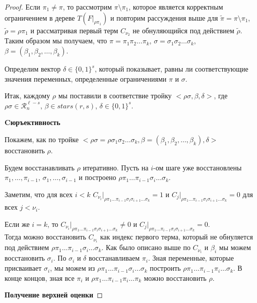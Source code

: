 \documentclass[12pt]{article}
\theoremstyle{plain}
\theoremstyle{remark}
\theoremstyle{definition}
\begin{document}
\begin{proof}
Если $\pi_1 \ne \pi$, то рассмотрим $\pi \setminus \pi_1$, которое является корректным ограничением в дереве $T(F|_{\rho\pi_1})$ и повторим рассуждения выше для $\widetilde{\pi} = \pi \setminus \pi_1$, $\widetilde{\rho} = \rho\pi_1$ и рассматривая первый терм  $C_{\nu_2}$ не обнуляющийся под действием $\widetilde{\rho}$. Таким образом мы получаем, что $\pi = \pi_1\pi_2\ldots \pi_k$, $\sigma = \sigma_1\sigma_2\ldots \sigma_k$, $\beta = \left( \beta_1, \beta_2, \ldots, \beta_k \right)$. 

Определим вектор $\delta \in \{0, 1\}^s$, который показывает, равны ли соответствующие значения переменных, определенные ограничениями $\pi$ и $\sigma$.

Итак, каждому $\rho$ мы поставили в соответствие тройку $<\rho\sigma, \beta, \delta>$, где $\rho\sigma \in \mathcal{R}_n^{\ell - s}$, $\beta \in stars(r, s)$, $\delta \in \{0, 1\}^s$.

\textbf{Cюръективность} 

Покажем, как по тройке $<\rho\sigma = \rho\sigma_1\sigma_2\ldots \sigma_k, \beta = \left( \beta_1, \beta_2, \ldots, \beta_k \right), \delta>$ восстановить $\rho$.

Будем восстанавливать $\rho$ итеративно.
Пусть на $i$-ом шаге уже восстановлены $\pi_1, \ldots, \pi_{i -1}$, $\sigma_1, \ldots, \sigma_{i - 1}$ и построено $\rho\pi_1\ldots\pi_{i -1}\sigma_i\ldots\sigma_k$. 

Заметим, что для всех $i < k$ $C_{\nu_i}|_{\rho\pi_1\ldots\pi_{i-1}\sigma_i\sigma_{i+1}\ldots\sigma_k} = 1$ и $C_j|_{\rho\pi_1\ldots\pi_{i-1}\sigma_i\sigma_{i+1}\ldots\sigma_k} = 0$ для всех $j < \nu_i$.  

Если же $i = k$, то $C_{\nu_i}|_{\rho\pi_1\ldots\pi_{i-1}\sigma_i\sigma_{i+1}\ldots\sigma_k} \ne 0$ и $C_j|_{\rho\pi_1\ldots\pi_{i-1}\sigma_i\sigma_{i+1}\ldots\sigma_k} = 0$. \\ Тогда можно восстановить $C_{\nu_i}$ как индекс первого терма, который не обнуляется под действием $\rho\pi_1\ldots\pi_{i -1}\sigma_i\ldots\sigma_k$.
Как было описано выше по $C_{\nu_i}$ и $\beta_i$ мы можем восстановить $\sigma_i$. По $\sigma_i$ и $\delta$ восстанавливаем $\pi_i$. Зная переменные, которые присваивает $\sigma_i$, мы можем из $\rho\pi_1\ldots\pi_{i -1}\sigma_i\ldots\sigma_k$ построить $\rho\pi_1\ldots\pi_{i -1}\pi_i\ldots\sigma_k$. В конце концов, зная все $\pi_i$ и $\rho\pi_1\ldots\pi_{i -1}\pi_i\ldots\pi_k$ можно восстановить $\rho$.

\textbf{Получение верхней оценки}


\end{proof}
\end{document}
